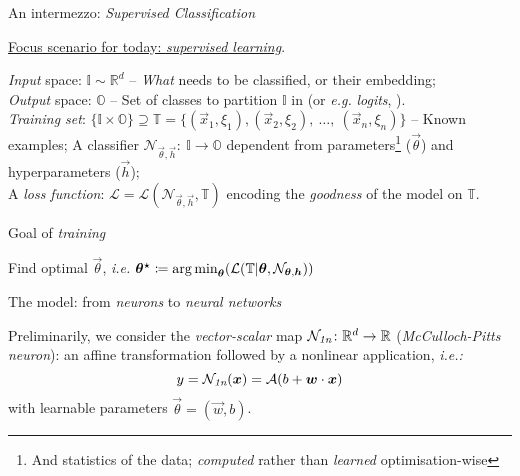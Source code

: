 {    \begin{frame}{ An intermezzo: \textit{Supervised Classification}}

        \underline{Focus scenario for today: \textit{supervised learning}}.
        \hfill\break

        \textit{Input} space: $\mathbb{I} \sim \mathbb{R}^{d}$ -- \textit{What} needs to be classified, or their embedding;\\
        \textit{Output} space: $\mathbb{O}$ -- Set of classes to \alert{partition} $\mathbb{I}$ in (or \textit{e.g.} \textit{logits}, \etc).\\
        \hfill\break
        \textit{Training set}: $\{\mathbb{I}\times\mathbb{O}\} \supseteq \mathbb{T} = \{(\vec{x}_1, \xi_1), (\vec{x}_2, \xi_2), \ \dots,\ (\vec{x}_n, \xi_n)\}$ -- Known examples;
        \hfill\break
        A classifier $\mathcal{N}_{\vec{\theta}, \vec{h}}: \ \mathbb{I} \rightarrow \mathbb{O}$ dependent from  \alert{parameters}\footnote{And statistics of the data; \textit{computed} rather than \textit{learned} optimisation-wise} ($\vec{\theta}$) and \alert{hyperparameters} ($\vec{h}$);\\
        A \alert{\textit{loss function}}: $\mathcal{L} = \mathcal{L}(\mathcal{N}_{\vec{\theta}, \vec{h}}, \mathbb{T})$ encoding the \textit{goodness} of the model on $\mathbb{T}$.
        \hfill\break

        \begin{block}{Goal of \textit{training}}

            Find optimal $\vec{\theta}$, \textit{i.e.} $\bm{\theta^{\star}} \coloneq \operatorname*{arg\,min}_{\bm{\theta}}(\mathcal{L}(\mathbb{T} | \bm{\theta}, \mathcal{N}_{\bm{\theta},\bm{h}}))$
        \end{block}

    \end{frame}
    \setcounter{footnote}{0}

    \begin{frame}{ The model: from \textit{neurons} to \textit{neural networks}}

        Preliminarily, we consider the \textit{vector-scalar} map $\mathcal{N}_{\textit{1n}}\colon \mathbb{R}^{d}\rightarrow\mathbb{R}$ (\textit{McCulloch-Pitts neuron}): an \alert{affine} transformation followed by a \alert{nonlinear} application, \textit{i.e.:}
        $$ y = \mathcal{N}_{\textit{1n}}(\bm{x}) = \mathcal{A}(b + \bm{w}\cdot\bm{x}) $$
        with learnable parameters $\vec{\theta} = (\vec{w}, b)$.


\end{frame}}

